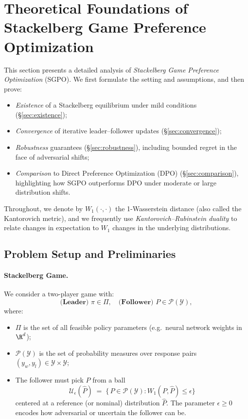 \section{Theoretical Foundations of Stackelberg Game Preference Optimization}
\label{sec:theory}

This section presents a detailed analysis of \emph{Stackelberg Game Preference Optimization} (SGPO).  We first formulate the setting and assumptions, and then prove:
\begin{itemize}
  \item \emph{Existence} of a Stackelberg equilibrium under mild conditions (\S\ref{sec:existence});
  \item \emph{Convergence} of iterative leader--follower updates (\S\ref{sec:convergence});
  \item \emph{Robustness} guarantees (\S\ref{sec:robustness}), including bounded regret in the face of adversarial shifts;
  \item \emph{Comparison} to Direct Preference Optimization (DPO) (\S\ref{sec:comparison}), highlighting how SGPO outperforms DPO under moderate or large distribution shifts.
\end{itemize}

Throughout, we denote by $W_1(\cdot,\cdot)$ the 1-Wasserstein distance (also called the Kantorovich metric), and we frequently use \emph{Kantorovich--Rubinstein duality} \cite{villani2003topics, peyre2019computational} to relate changes in expectation to $W_1$ changes in the underlying distributions.

\subsection{Problem Setup and Preliminaries}
\label{sec:setup}

\paragraph{Stackelberg Game.}
We consider a two-player game with:
\[
\textbf{(Leader) } \pi \in \Pi,
\quad
\textbf{(Follower) } P \in \mathcal{P}(\mathcal{Y}),
\]
where:
\begin{itemize}
\item $\Pi$ is the set of all feasible policy parameters (e.g.\ neural network weights in $\R^d$);
\item $\mathcal{P}(\mathcal{Y})$ is the set of probability measures over response pairs $(y_w,y_l)\in \mathcal{Y}\times \mathcal{Y}$; 
\item The follower must pick $P$ from a ball
\[
\mathcal{U}_\epsilon(\hat{P}) \;=\; \bigl\{\,P\in \mathcal{P}(\mathcal{Y}):W_1(P,\hat{P})\le \epsilon \bigr\}
\]
centered at a reference (or nominal) distribution $\hat{P}$.  The parameter $\epsilon\ge 0$ encodes how adversarial or uncertain the follower can be.
\end{itemize}

